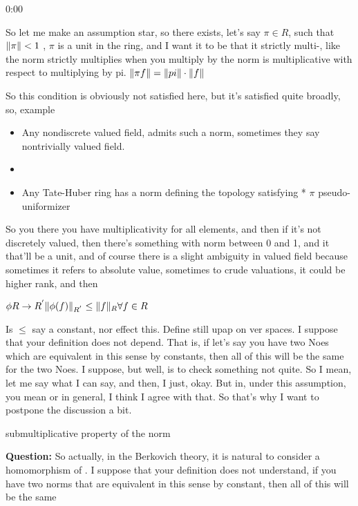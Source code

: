 \begin{unfinished}{0:00}
{So let me make an assumption star, so there exists, let's say $\pi \in R$, such that $\| \pi \| < 1$ , $\pi$ is a unit in the ring, and I want it to be that it strictly multi-, like the norm strictly multiplies when you multiply by the norm is multiplicative with respect to multiplying by pi. $\| \pi f \| = \| pi \| \cdot \| f \|$

So this condition is obviously not satisfied here, but it's satisfied quite broadly, so, example

\begin{example}
\begin{itemize}
\item Any nondiscrete valued field, admits such a norm, sometimes they say nontrivially valued field. 
\item 
\item Any Tate-Huber ring has a norm defining the topology satisfying * $\pi$ pseudo-uniformizer %
\end{itemize}

\end{example}
So you there you have multiplicativity for all elements, and then if it's not discretely valued, then there's something with norm between 0 and 1, and it that'll be a unit, and of course there is a slight ambiguity in valued field because sometimes it refers to absolute value, sometimes to crude valuations, it could be higher rank, and then

$
\phi R \to R^{'}
\| \phi(f) \|_{R^{'}} \leq \| f \|_{R} \forall f \in R
$

Is $\leq$ say a constant, nor effect this. Define still upap on ver spaces. I suppose that your definition does not depend. That is, if let's say you have two Noes which are equivalent in this sense by constants, then all of this will be the same for the two Noes. I suppose, but well, is to check something not quite. So I mean, let me say what I can say, and then, I just, okay. But in, under this assumption, you mean or in general, I think I agree with that. So that's why I want to postpone the discussion a bit. 

submultiplicative property of the norm

\textbf{Question:} So actually, in the Berkovich theory,  it is natural to consider a homomorphism of .
I suppose that your definition does not understand, if you have two norms that are equivalent in this sense by constant, then all of this will be the same

}
\end{unfinished}
